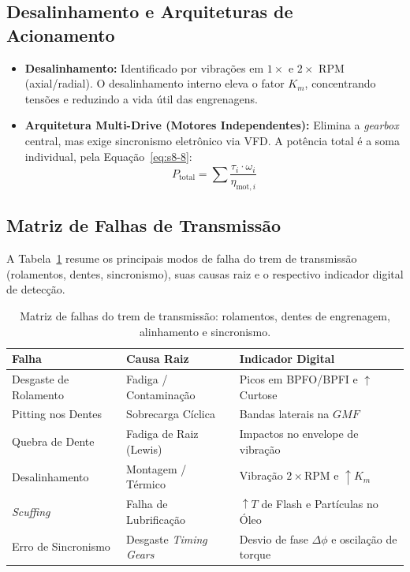 \documentclass[12pt,a4paper]{article}
\numberwithin{equation}{section}
\numberwithin{table}{section}
\numberwithin{figure}{section}
\begin{document}
	\subsection{\textbf{Desalinhamento e Arquiteturas de Acionamento}}
	\begin{itemize}
		\item \textbf{Desalinhamento:} Identificado por vibrações em $1 \times$ e $2 \times$ RPM (axial/radial). O desalinhamento interno eleva o fator $K_m$, concentrando tensões e reduzindo a vida útil das engrenagens.
		\item \textbf{Arquitetura Multi-Drive (Motores Independentes):} Elimina a \textit{gearbox} central, mas exige sincronismo eletrônico via VFD. A potência total é a soma individual, pela Equação~\eqref{eq:s8-8}:
		\begin{equation}\label{eq:s8-8}
 P_{\text{total}} = \sum \frac{\tau_i \cdot \omega_i}{\eta_{\text{mot},i}} 
\end{equation}
	\end{itemize}
	
	\subsection{\textbf{Matriz de Falhas de Transmissão}}
	A Tabela~\ref{tab:8-1} resume os principais modos de falha do trem de transmissão (rolamentos, dentes, sincronismo), suas causas raiz e o respectivo indicador digital de detecção.
	\begin{table}[h!tbp]
		\centering
		\small
		\renewcommand{\arraystretch}{1.5}
		\begin{tabular}{l l l}
			\toprule
			\textbf{Falha} & \textbf{Causa Raiz} & \textbf{Indicador Digital} \\ \midrule
			Desgaste de Rolamento & Fadiga / Contaminação & Picos em BPFO/BPFI e $\uparrow$ Curtose \\
			Pitting nos Dentes & Sobrecarga Cíclica & Bandas laterais na $GMF$ \\
			Quebra de Dente & Fadiga de Raiz (Lewis) & Impactos no envelope de vibração \\
			Desalinhamento & Montagem / Térmico & Vibração $2 \times \text{RPM}$ e $\uparrow K_m$ \\
			\textit{Scuffing} & Falha de Lubrificação & $\uparrow T$ de Flash e Partículas no Óleo \\
			Erro de Sincronismo & Desgaste \textit{Timing Gears} & Desvio de fase $\Delta \phi$ e oscilação de torque \\ \bottomrule
		\end{tabular}
		\caption[Matriz de falhas do trem de transmissão]{Matriz de falhas do trem de transmissão: rolamentos, dentes de engrenagem, alinhamento e sincronismo.}
		\label{tab:8-1}
	\end{table}
	
\end{document}
